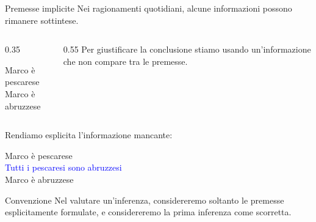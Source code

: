 \documentclass[aspectratio=169,10pt,dvipsnames,handout]{beamer}
\begin{document}
\begin{frame}{Premesse implicite}
	Nei ragionamenti quotidiani, alcune informazioni possono
	rimanere sottintese.

	\begin{example}
		\begin{columns}
			\begin{column}{0.35\textwidth}
				\centering
				\begin{inference}
					Marco è pescarese\\
					\hline
					Marco è abruzzese
				\end{inference}
			\end{column}

			\begin{column}{0.55\textwidth}
				Per giustificare la conclusione stiamo usando
				un'informazione che non compare tra le premesse.
			\end{column}
		\end{columns}
	\end{example}

	\pause
	Rendiamo esplicita l'informazione mancante:

	\begin{example}
		\begin{center}
			\begin{inference}
				Marco è pescarese\\
				\textcolor{blue}{Tutti i pescaresi sono abruzzesi}\\
				\hline
				Marco è abruzzese
			\end{inference}
		\end{center}
	\end{example}

	\begin{block}{Convenzione}
		Nel valutare un'inferenza, considereremo soltanto le premesse esplicitamente formulate, e considereremo la prima inferenza come scorretta.
	\end{block}
\end{frame}

%
%
\end{document}
